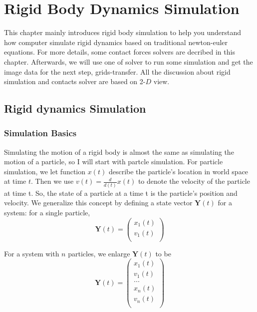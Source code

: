 \chapter{Rigid Body Dynamics Simulation}

This chapter mainly introduces rigid body simulation to help you understand how computer simulate rigid dynamics based on traditional newton-euler equations. For more details, some contact forces solvers are decribed in this chapter. Afterwards, we will use one of solver to run some simulation and get the image data for the next step, grids-transfer. All the discussion about rigid simulation and contacts solver are based on 2-$D$ view.

\section{Rigid dynamics Simulation}

\subsection{Simulation Basics}

Simulating the motion of a rigid body is almost the same as simulating the motion of a particle, so I will start with partcle simulation. For particle simulation, we let function $x(t)$ describe the particle's location in world space at time $t$. Then we use $v(t)=\frac{d}{d(t)}x(t)$
to denote the velocity of the particle at time t. So, the state of a particle at a time t is the particle's position and velocity. We generalize this concept by defining a state vector $\textbf{Y}(t)$ for a system: for a single particle,
\begin{equation}
    \textbf{Y}(t) = \left(
        \begin{array}{c}
            x_{1}(t) \\
            v_{1}(t) \\
        \end{array}
    \right)
\end{equation}

For a system with $n$ particles, we enlarge $\textbf{Y}(t)$ to be
\begin{equation}
    \textbf{Y}(t) = \left(
    \begin{array}{c}
        x_{1}(t) \\
        v_{1}(t) \\
        ... \\
        x_{n}(t) \\
        v_{n}(t) \\
    \end{array}
    \right)
\end{equation}

